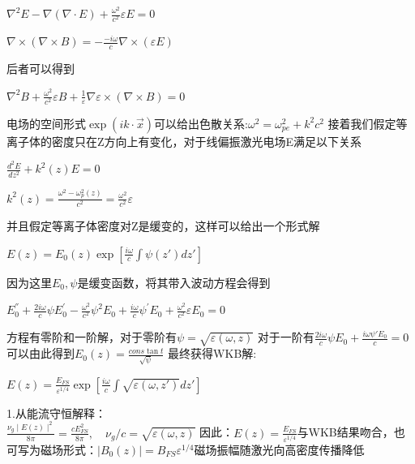 \documentclass[12pt, a4paper, oneside]{ctexart}
\begin{document}
\begin{spacing}{2.0}
\begin{center}
    $\displaystyle \nabla^{2}E-\nabla(\nabla\cdot E)+{\frac{\omega^{2}}{c^{2}}}\varepsilon E=0$
\end{center}
\begin{center}
    $\displaystyle \nabla\times(\nabla\times B)=-{\frac{-i\omega}{c}}\nabla\times(\varepsilon E)$
\end{center}
后者可以得到
\begin{center}
    $\displaystyle \nabla^2 B + \frac{\omega^2}{c^2}\varepsilon B + \frac{1}{\varepsilon}\nabla \varepsilon \times(\nabla \times B) = 0$
\end{center}
电场的空间形式$\displaystyle \exp(ik\cdot \vec{x})$可以给出色散关系:$\displaystyle \omega^2 = \omega_{pe}^2+k^2c^2$
接着我们假定等离子体的密度只在Z方向上有变化，对于线偏振激光电场E满足以下关系
\begin{center}
    $\displaystyle\frac{d^{2}E}{d z^{2}}+k^{2}(z)E=0$
\end{center}
\begin{center}
    $\displaystyle k^{2}(z)=\frac{\omega^{2}-\omega_{p}^{2}(z)}{c^{2}}=\frac{\omega^{2}}{c^{2}}\varepsilon$
\end{center}
并且假定等离子体密度对Z是缓变的，这样可以给出一个形式解
\begin{center}
    $\displaystyle E(z)=E_0(z)\exp[\frac{i\omega}{c}\int\psi(z')dz']$
\end{center}
因为这里$E_0, \psi$是缓变函数，将其带入波动方程会得到
\begin{center}
    $\displaystyle E_{0}^{''}+\frac{2i\omega}{c}\psi E_{0}^{'}-\frac{\omega^{2}}{c^{2}}\psi^{2}E_{0}+\frac{i\omega}{c}\psi^{'}E_{0}+\frac{\omega^{2}}{c^{2}}\varepsilon E_{0}=0$
\end{center}
方程有零阶和一阶解，对于零阶有$\displaystyle \psi = \sqrt{\varepsilon(\omega, z)}$
对于一阶有$\displaystyle \frac{2i\omega}{c}\psi E_0+\frac{i\omega\psi'E_0}{c}=0$可以由此得到$\displaystyle E_0(z)=\frac{cons\tan t}{\sqrt{\psi}}$
最终获得WKB解:
\begin{center}
    $\displaystyle E(z)=\frac{E_{F S}}{\varepsilon^{1/4}}\exp[\frac{i\omega}{c}\int\sqrt{\varepsilon(\omega,z')}d z']$
\end{center}
1.从能流守恒解释：
\\
$\displaystyle \frac{\nu_{g}\mid E(z)\mid^{2}}{8\pi}=\frac{c E_{F S}^{2}}{8\pi},\quad\nu_{g}/c=\sqrt{\varepsilon(\omega,z)}$
因此：$\displaystyle E(z) = \frac{E_{FS}}{\varepsilon^{1/4}}$与WKB结果吻合，也可写为磁场形式：$\displaystyle |B_0(z)| = B_{FS}\varepsilon^{1/4}$磁场振幅随激光向高密度传播降低


\end{spacing}
\end{document}
